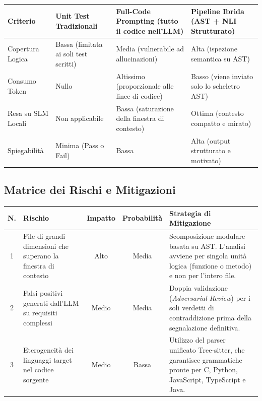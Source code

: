 \documentclass[a4paper, 11pt]{article}
\begin{document}
\vspace{0.3cm}
\noindent
\renewcommand{\arraystretch}{1.3}
\begin{tabularx}{\textwidth}{|l|X|X|X|}
    \hline
    \textbf{Criterio} & \textbf{Unit Test Tradizionali} & \textbf{Full-Code Prompting (tutto il codice nell'LLM)} & \textbf{Pipeline Ibrida (AST + NLI Strutturato)} \\ \hline
    Copertura Logica & Bassa (limitata ai soli test scritti) & Media (vulnerabile ad allucinazioni) & Alta (ispezione semantica su AST) \\ \hline
    Consumo Token & Nullo & Altissimo (proporzionale alle linee di codice) & Basso (viene inviato solo lo scheletro AST) \\ \hline
    Resa su SLM Locali & Non applicabile & Bassa (saturazione della finestra di contesto) & Ottima (contesto compatto e mirato) \\ \hline
    Spiegabilità & Minima (Pass o Fail) & Bassa & Alta (output strutturato e motivato) \\ \hline
\end{tabularx}
\vspace{0.3cm}

\subsection{Matrice dei Rischi e Mitigazioni}

\vspace{0.3cm}
\noindent
\begin{tabularx}{\textwidth}{|c|X|c|c|X|}
    \hline
    \textbf{N.} & \textbf{Rischio} & \textbf{Impatto} & \textbf{Probabilità} & \textbf{Strategia di Mitigazione} \\ \hline
    1 & File di grandi dimensioni che superano la finestra di contesto & Alto & Media & Scomposizione modulare basata su AST. L'analisi avviene per singola unità logica (funzione o metodo) e non per l'intero file. \\ \hline
    2 & Falsi positivi generati dall'LLM su requisiti complessi & Medio & Media & Doppia validazione (\textit{Adversarial Review}) per i soli verdetti di contraddizione prima della segnalazione definitiva. \\ \hline
    3 & Eterogeneità dei linguaggi target nel codice sorgente & Medio & Bassa & Utilizzo del parser unificato Tree-sitter, che garantisce grammatiche pronte per C, Python, JavaScript, TypeScript e Java. \\ \hline
\end{tabularx}
\vspace{0.3cm}
\end{document}
